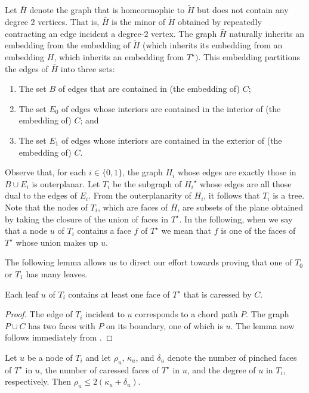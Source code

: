 \documentclass{patmorin}
\newcommand{\dual}[1]{{#1}^\star}
\begin{document}
Let $\bar{H}$ denote the graph that is homeormophic to $\tilde{H}$ but does not
contain any degree 2 vertices.  That is, $\bar{H}$ is the minor of $\tilde{H}$
obtained by repeatedly contracting an edge incident a degree-2 vertex.
The graph $\bar{H}$ naturally inherits an embedding from the embedding of $\tilde{H}$ (which inherits its embedding from an embedding $H$, which inherits an embedding from $\dual{T})$.  This embedding partitions the edges of $\bar{H}$ into three sets:
\begin{enumerate}
  \item The set $B$ of edges that are contained in (the embedding of) $C$;
  \item The set $E_0$ of edges whose interiors are contained in the interior of (the embedding of) $C$; and
  \item The set $E_1$ of edges whose interiors are contained in the exterior of (the embedding of) $C$.
\end{enumerate}

Observe that, for each $i\in\{0,1\}$, the graph $H_i$ whose edges are
exactly those in $B\cup E_i$ is outerplanar.  Let $T_i$ be the subgraph of
$\dual{H_i}$ whose edges are all those dual to the edges of $E_i$. From
the outerplanarity of $H_i$, it follows that $T_i$ is a tree. Note that
the nodes of $T_i$, which are faces of $\bar{H}$, are subsets of the
plane obtained by taking the closure of the union of faces in $\dual{T}$.
In the following, when we say that a node $u$ of $T_i$ contains a face
$f$ of $\dual{T}$ we mean that $f$ is one of the faces of $\dual{T}$
whose union makes up $u$.


The following lemma allows us to direct our effort towards proving that
one of $T_0$ or $T_1$ has many leaves.

\begin{lem}
   Each leaf $u$ of $T_i$ contains at least one face of $\dual{T}$
   that is caressed by $C$.
\end{lem}

\begin{proof}
   The edge of $T_i$ incident to $u$ corresponds to a chord path $P$. The
   graph $P\cup C$ has two faces with $P$ on its boundary, one of which
   is $u$.  The lemma now follows immediately from .
\end{proof}


\begin{lem}
   Let $u$ be a node of $T_i$ and let $\rho_u$, $\kappa_u$, and $\delta_u$ denote the number of pinched faces of $\dual{T}$ in $u$, the number of caressed faces of $\dual{T}$ in $u$, and the degree of $u$ in $T_i$, respectively.  Then $\rho_u \le 2(\kappa_u+\delta_u)$.
\end{lem}
\end{document}

